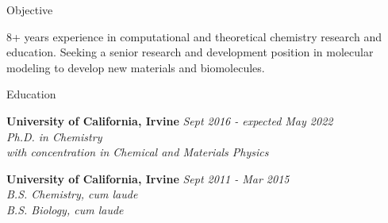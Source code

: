 \documentclass{resume} %
\begin{document}
{\centerline { } }
\vspace{-0.3in}
\begin{rSection}{Objective}
  
  8+ years experience in computational and theoretical chemistry research and education.
  Seeking a senior research and development position in molecular modeling to develop new
  materials and biomolecules. 

\end{rSection}

\begin{rSection}{Education}

{\bf University of California, Irvine} \hfill {\em Sept 2016 - expected May 2022} 
\\{\textit{Ph.D. in Chemistry \\
    with concentration in Chemical and Materials Physics}}

{\bf University of California, Irvine} \hfill {\em Sept 2011 - Mar 2015} 
\\ { \textit{B.S. Chemistry, cum laude}} \hfill
\\ { \textit{B.S. Biology, cum laude}} \hfill

\end{rSection}
\end{document}
